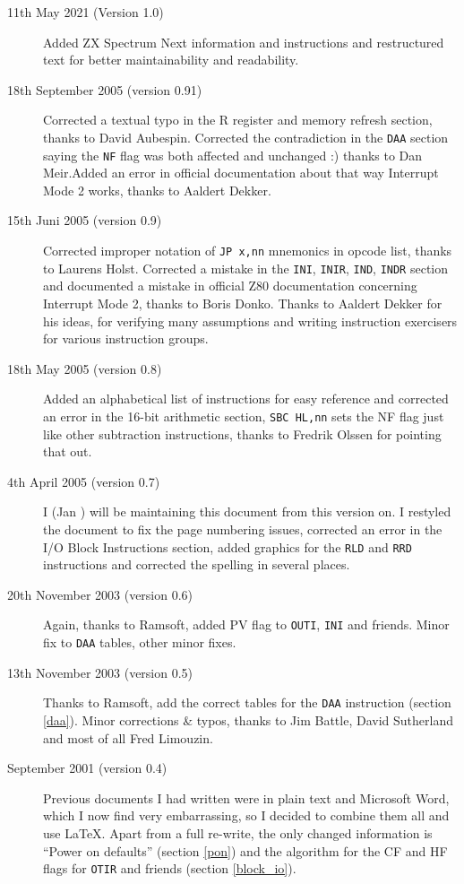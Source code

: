 \begin{description}

	\item[11th May 2021 (Version 1.0)]
	Added ZX Spectrum Next information and instructions and restructured text for better maintainability and readability.

	\item[18th September 2005 (version 0.91)]
	Corrected a textual typo in the R register and memory refresh section, thanks to David Aubespin. Corrected the contradiction in the {\tt DAA} section saying the {\tt NF} flag was both affected and unchanged :) thanks to Dan Meir.Added an error in official documentation about that way Interrupt Mode 2 works, thanks to Aaldert Dekker.
	
	\item[15th Juni 2005 (version 0.9)]
	Corrected improper notation of {\tt JP x,nn} mnemonics in opcode list, thanks to Laurens Holst. Corrected a mistake in the {\tt INI}, {\tt INIR}, {\tt IND}, {\tt INDR} section and documented a mistake in official Z80 documentation concerning Interrupt Mode 2, thanks to Boris Donko. Thanks to Aaldert Dekker for his ideas, for verifying many assumptions and writing instruction exercisers for various instruction groups.

	\item[18th May 2005 (version 0.8)]
	Added an alphabetical list of instructions for easy reference and corrected an error in the 16-bit arithmetic section, {\tt SBC HL,nn} sets the NF flag just like other subtraction instructions, thanks to Fredrik Olssen for pointing that out.

	\item[4th April 2005 (version 0.7)]
	I (Jan ) will be maintaining this document from this version on. I restyled the document to fix the page numbering issues, corrected an error in the I/O Block Instructions section, added graphics for the {\tt RLD} and {\tt RRD} instructions and corrected the spelling in several places.

	\item[20th November 2003 (version 0.6)]
	Again, thanks to Ramsoft, added PV flag to {\tt OUTI}, {\tt INI} and friends. Minor fix to {\tt DAA} tables, other minor fixes.

	\item[13th November 2003 (version 0.5)]
	Thanks to Ramsoft, add the correct tables for the {\tt DAA} instruction (section \ref{daa}). Minor corrections \& typos, thanks to Jim Battle, David Sutherland and most of all Fred Limouzin.

	\item[September 2001 (version 0.4)]
	Previous documents I had written were in plain text and Microsoft Word, which I now find very embarrassing, so I decided to combine them all and use {\LaTeX}. Apart from a full re-write, the only changed information is ``Power on defaults'' (section \ref{pon}) and the algorithm for the CF and HF flags for {\tt OTIR} and friends (section \ref{block_io}).

\end{description}


\pagebreak
\IntentionallyEmpty
\pagebreak
